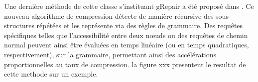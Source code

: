 
	Une dernière méthode de cette classe s'instituant gRepair a été proposé dans \citep{maneth2018grammar}. Ce nouveau algorithme de compression détecte de manière récursive des sous-structures répétées et les représente via des règles de grammaire.  Des requêtes spécifiques telles que l'accessibilité entre deux nœuds ou des requêtes de chemin normal peuvent ainsi être évaluées en temps linéaire (ou en temps quadratiques, respectivement), sur la grammaire, permettant ainsi des accélérations proportionnelles au taux de compression. la figure xxx presentent le resultat de cette methode sur un exemple. 